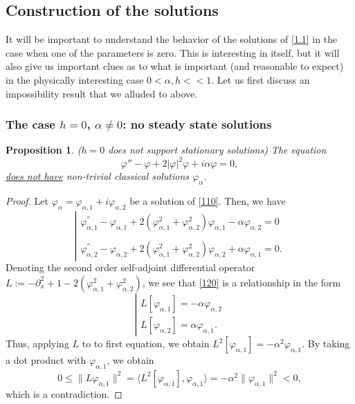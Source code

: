 \documentclass[12pt]{amsart}
\newtheorem{proposition}{Proposition}
\theoremstyle{definition}
\theoremstyle{remark}
\numberwithin{equation}{section}
\renewcommand{\(}{\left(}
\renewcommand{\)}{\right)}
\renewcommand{\[}{\left[}
\renewcommand{\]}{\right]}
\newcommand{\al}{\alpha}
\newcommand{\vp}{\varphi}
\newcommand{\dpr}[2]{\langle #1,#2 \rangle}
\newcommand{\p}{\partial}
\begin{document}
\subsection{Construction of the solutions} It will be important to understand the behavior of the solutions of \eqref{1.1} in the case when one of the parameters is zero. This is interesting in itself, but it will also give us important clues as to what is important (and reasonable  to expect) in the physically interesting  case $0<\al, h<<1 $.
Let us first discuss an impossibility result that we alluded to above.
\subsubsection{The case $h=0$, $\al\neq 0$: no  steady state  solutions}
\begin{proposition}($h=0$ does not support stationary solutions)
	\label{obs:10}
The equation
	\begin{equation}
	\label{110}
	\vp''-\vp+2|\vp|^2 \vp +i \al \vp=0,
	\end{equation}
	\underline{does not have}  non-trivial classical solutions $\vp_\al$.
\end{proposition}
\begin{proof}
	Let $\varphi_{\alpha}=\varphi_{\alpha, 1}+i\varphi_{\alpha, 2}$ be  a solution of \eqref{110}. Then, we have
	\begin{equation}
	\label{120}
	\left| \begin{array}{ll} \varphi_{\alpha,1}^{''}-\varphi_{\alpha,1}+2(\varphi_{\alpha,1}^2+\varphi_{\alpha, 2}^2)\varphi_{\alpha, 1}-\alpha\varphi_{\alpha, 2}=0 \\
	\\
	\varphi_{\alpha,2}^{''}-\varphi_{\alpha,2}+2(\varphi_{\alpha,1}^2+\varphi_{\alpha, 2}^2)\varphi_{\alpha, 2}+\alpha\varphi_{\alpha, 1}=0.
	\end{array} \right.
	\end{equation}
	Denoting the second order self-adjoint differential operator $L:=-\p_x^2+1 - 2(\varphi_{\alpha,1}^2+\varphi_{\alpha, 2}^2)$, we see that \eqref{120} is a relationship in the form
	$$
	\left| \begin{array}{l}
	L[\vp_{\al,1}]=-\al \vp_{\al,2} \\
	L[\vp_{\al,2}]=\al \vp_{\al,1}.
	\end{array}
	\right.
	$$
	Thus, applying $L$ to to first equation, we obtain $L^2[\vp_{\al,1}]=-\al^2 \vp_{\al,1}$. By taking a dot product with $\vp_{\al,1}$, we obtain
	$$
	0\leq \|L \vp_{\al,1}\|^2=\dpr{L^2[\vp_{\al,1}]}{\vp_{\al,1}}=-\al^2\|\vp_{\al,1}\|^2<0,
	$$
	which  is a contradiction.
\end{proof}
\end{document}
